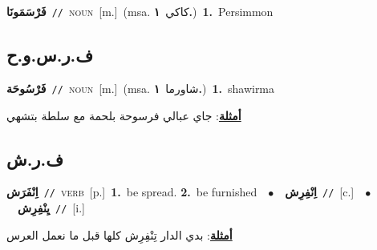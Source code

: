 \documentclass[10pt,a4paper,twoside]{article} %
\begin{document}
\begin{multicols}{2}
{\setlength\topsep{0pt}\textbf{\foreignlanguage{arabic}{فَرْسَمَونَا}}\ {\color{gray}\texttt{//}\color{black}}\ \textsc{noun}\ [m.]\ \color{gray}(msa. \foreignlanguage{arabic}{كاكي}~\foreignlanguage{arabic}{\textbf{١.}})\color{black}\ \textbf{1.}~Persimmon\ } \vspace{2mm}

\vspace{-3mm}
\subsection*{\color{blue}\foreignlanguage{arabic}{ف.ر.س.و.ح}\color{blue}{ (ntws)}} 

{\setlength\topsep{0pt}\textbf{\foreignlanguage{arabic}{فَرْسُوحَة}}\ {\color{gray}\texttt{//}\color{black}}\ \textsc{noun}\ [m.]\ \color{gray}(msa. \foreignlanguage{arabic}{شاورما}~\foreignlanguage{arabic}{\textbf{١.}})\color{black}\ \textbf{1.}~shawirma\  \begin{flushright}\color{gray}\foreignlanguage{arabic}{\textbf{\underline{\foreignlanguage{arabic}{أمثلة}}}: جاي عبالي فرسوحة بلحمة مع سلطة بتشهي}\end{flushright}\color{black}} \vspace{2mm}

\vspace{-3mm}
\subsection*{\color{blue}\foreignlanguage{arabic}{ف.ر.ش}\color{blue}{}} 

{\setlength\topsep{0pt}\textbf{\foreignlanguage{arabic}{اِنْفَرَش}}\ {\color{gray}\texttt{//}\color{black}}\ \textsc{verb}\ [p.]\ \textbf{1.}~be spread.  \textbf{2.}~be furnished\ \ $\bullet$\ \ \setlength\topsep{0pt}\textbf{\foreignlanguage{arabic}{اِنْفِرِش}}\ {\color{gray}\texttt{//}\color{black}}\ [c.]\ \ $\bullet$\ \ \setlength\topsep{0pt}\textbf{\foreignlanguage{arabic}{يِنْفِرِش}}\ {\color{gray}\texttt{//}\color{black}}\ [i.]\  \begin{flushright}\color{gray}\foreignlanguage{arabic}{\textbf{\underline{\foreignlanguage{arabic}{أمثلة}}}: بدي الدار تِنْفِرِش كلها قبل ما نعمل العرس}\end{flushright}\color{black}} \vspace{2mm}


\end{multicols}
\end{document}
